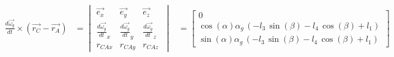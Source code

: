 \begin{equation*}
\begin{split}
\frac{d\overrightarrow{\omega_{g}}}{dt}\times(\overrightarrow{r_{C}}-\overrightarrow{r_{A}})
&=	\begin{vmatrix}
	\overrightarrow{e_{x}} & \overrightarrow{e_{y}} & \overrightarrow{e_{z}}\\
	\frac{d\overrightarrow{\omega_g}}{dt}_{x} & \frac{d\overrightarrow{\omega_g}}{dt}_{y} & \frac{d\overrightarrow{\omega_g}}{dt}_{z}\\
	r_{CAx} & r_{CAy} & r_{CAz}\
	\end{vmatrix}
&=	\begin{bmatrix}
	0\\
	\cos \left( \alpha\right) \alpha_{g}\, \left( -l_{3}\,\sin \left( \beta \right) -l_{4}\,\cos \left( \beta \right) +l_{1} \right) \\
	\sin\left( \alpha \right) \alpha_{g}\, \left( -l_{3}\,\sin \left( \beta\right) -l_{4}\,\cos \left( \beta \right) +l_{1} \right)\
\end{bmatrix}
\end{split}
\end{equation*}